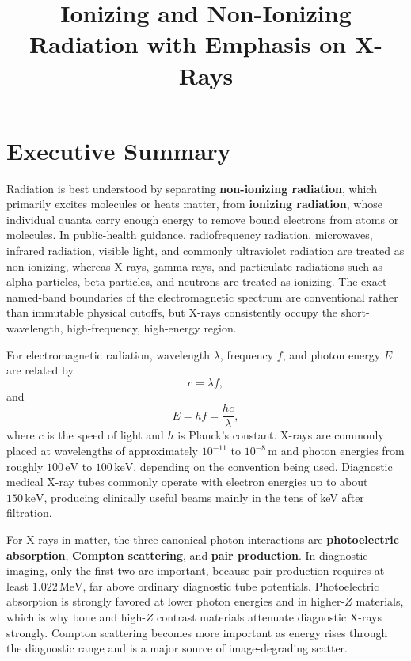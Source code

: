 \documentclass[12pt]{article}
\title{Ionizing and Non-Ionizing Radiation with Emphasis on X-Rays}
\author{}
\date{}
\begin{document}
\maketitle

\section*{Executive Summary}

Radiation is best understood by separating \textbf{non-ionizing radiation}, which primarily excites molecules or heats matter, from \textbf{ionizing radiation}, whose individual quanta carry enough energy to remove bound electrons from atoms or molecules. In public-health guidance, radiofrequency radiation, microwaves, infrared radiation, visible light, and commonly ultraviolet radiation are treated as non-ionizing, whereas X-rays, gamma rays, and particulate radiations such as alpha particles, beta particles, and neutrons are treated as ionizing. The exact named-band boundaries of the electromagnetic spectrum are conventional rather than immutable physical cutoffs, but X-rays consistently occupy the short-wavelength, high-frequency, high-energy region.

For electromagnetic radiation, wavelength $\lambda$, frequency $f$, and photon energy $E$ are related by
\begin{equation}
    c = \lambda f,
\end{equation}
and
\begin{equation}
    E = hf = \frac{hc}{\lambda},
\end{equation}
where $c$ is the speed of light and $h$ is Planck's constant. X-rays are commonly placed at wavelengths of approximately $10^{-11}$ to $10^{-8}\,\mathrm{m}$ and photon energies from roughly $100\,\mathrm{eV}$ to $100\,\mathrm{keV}$, depending on the convention being used. Diagnostic medical X-ray tubes commonly operate with electron energies up to about $150\,\mathrm{keV}$, producing clinically useful beams mainly in the tens of keV after filtration.

For X-rays in matter, the three canonical photon interactions are \textbf{photoelectric absorption}, \textbf{Compton scattering}, and \textbf{pair production}. In diagnostic imaging, only the first two are important, because pair production requires at least $1.022\,\mathrm{MeV}$, far above ordinary diagnostic tube potentials. Photoelectric absorption is strongly favored at lower photon energies and in higher-$Z$ materials, which is why bone and high-$Z$ contrast materials attenuate diagnostic X-rays strongly. Compton scattering becomes more important as energy rises through the diagnostic range and is a major source of image-degrading scatter.
\end{document}
